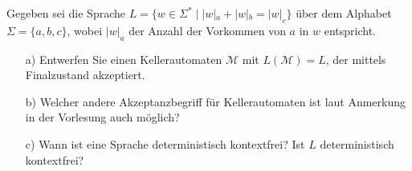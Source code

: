 
\begin{exercise}
Gegeben sei die Sprache $L=\{w\in \Sigma^*\;|\;|w|_a+|w|_b=|w|_c\}$ \"uber dem Alphabet $\Sigma =\{a,b,c\}$, wobei $|w|_a$ der Anzahl der Vorkommen von $a$ in $w$ entspricht.
 \begin{enumerate}
    \item[a)] Entwerfen Sie einen Kellerautomaten $\mathcal{M}$ mit $L(\mathcal{M})=L$, der mittels Finalzustand akzeptiert.
    \item[b)] Welcher andere Akzeptanzbegriff f\"ur Kellerautomaten ist laut Anmerkung in der Vorlesung auch m\"oglich?
    \item[c)] Wann ist eine Sprache deterministisch kontextfrei? Ist $L$ deterministisch kontextfrei?
 \end{enumerate}
\end{exercise}

